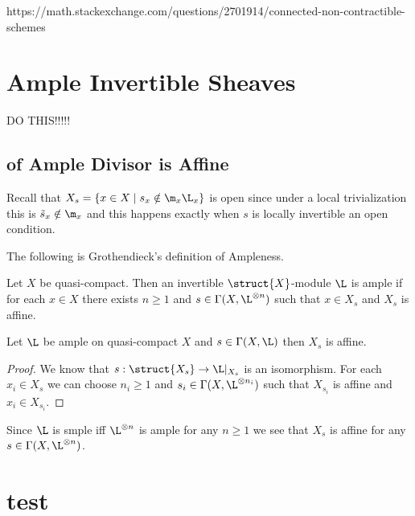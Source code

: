 \documentclass[12pt]{article}
\begin{document}
\begin{example}
https://math.stackexchange.com/questions/2701914/connected-non-contractible-schemes
\end{example}

\section{Ample Invertible Sheaves}

DO THIS!!!!!

\subsection{ of Ample Divisor is Affine}

\begin{rmk}
Recall that $X_s = \{ x \in X \mid s_x \notin \m_x \L_x \}$ is open since under a local trivialization this is $\tilde{s}_x \notin \m_x$ and this happens exactly when $s$ is locally invertible an open condition.
\end{rmk}

\begin{rmk}
The following is Grothendieck's definition of Ampleness.
\end{rmk}

\begin{defn}
Let $X$ be quasi-compact. Then an invertible $\struct{X}$-module $\L$ is ample if for each $x \in X$ there exists $n \ge 1$ and $s \in \Gamma(X, \L^{\otimes n})$ such that $x \in X_s$ and $X_s$ is affine.
\end{defn}

\begin{theorem}
Let $\L$ be ample on quasi-compact $X$ and $s \in \Gamma(X, \L)$ then $X_s$ is affine.
\end{theorem}

\begin{proof}
We know that $s : \struct{X_s} \to \L|_{X_s}$ is an isomorphism. For each $x_i \in X_s$ we can choose $n_i \ge 1$ and $s_i \in \Gamma(X, \L^{\otimes n_i})$ such that $X_{s_i}$ is affine and $x_i \in X_{s_i}$.  
\end{proof}

\begin{rmk}
Since $\L$ is smple iff $\L^{\otimes n}$ is ample for any $n \ge 1$ we see that $X_s$ is affine for any $s \in \Gamma(X, \L^{\otimes n})$. 
\end{rmk}

\section{test}
\end{document}
